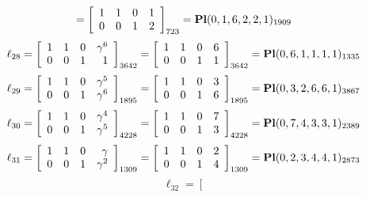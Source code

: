 \documentclass{article}
\begin{document}
{$$=
\left[
\begin{array}{*{4}c}
1  & 1  & 0  & 1\\
0  & 0  & 1  & 2\\
\end{array}
\right]_{723}
={\rm\bf Pl}(0,1,6,2,2,1 )_{1909}$$
$$
\ell_{28} = 
\left[
\begin{array}{*{4}{r}}
1 & 1 & 0 & \gamma^{6}\\
0 & 0 & 1 & 1\\
\end{array}
\right]
_{3642}
=
\left[
\begin{array}{*{4}c}
1  & 1  & 0  & 6\\
0  & 0  & 1  & 1\\
\end{array}
\right]_{3642}
={\rm\bf Pl}(0,6,1,1,1,1 )_{1335}$$
$$
\ell_{29} = 
\left[
\begin{array}{*{4}{r}}
1 & 1 & 0 & \gamma^{5}\\
0 & 0 & 1 & \gamma^{6}\\
\end{array}
\right]
_{1895}
=
\left[
\begin{array}{*{4}c}
1  & 1  & 0  & 3\\
0  & 0  & 1  & 6\\
\end{array}
\right]_{1895}
={\rm\bf Pl}(0,3,2,6,6,1 )_{3867}$$
$$
\ell_{30} = 
\left[
\begin{array}{*{4}{r}}
1 & 1 & 0 & \gamma^{4}\\
0 & 0 & 1 & \gamma^{5}\\
\end{array}
\right]
_{4228}
=
\left[
\begin{array}{*{4}c}
1  & 1  & 0  & 7\\
0  & 0  & 1  & 3\\
\end{array}
\right]_{4228}
={\rm\bf Pl}(0,7,4,3,3,1 )_{2389}$$
$$
\ell_{31} = 
\left[
\begin{array}{*{4}{r}}
1 & 1 & 0 & \gamma \\
0 & 0 & 1 & \gamma^{2}\\
\end{array}
\right]
_{1309}
=
\left[
\begin{array}{*{4}c}
1  & 1  & 0  & 2\\
0  & 0  & 1  & 4\\
\end{array}
\right]_{1309}
={\rm\bf Pl}(0,2,3,4,4,1 )_{2873}$$
$$
\ell_{32} = 
\left[
$$}
\end{document}
